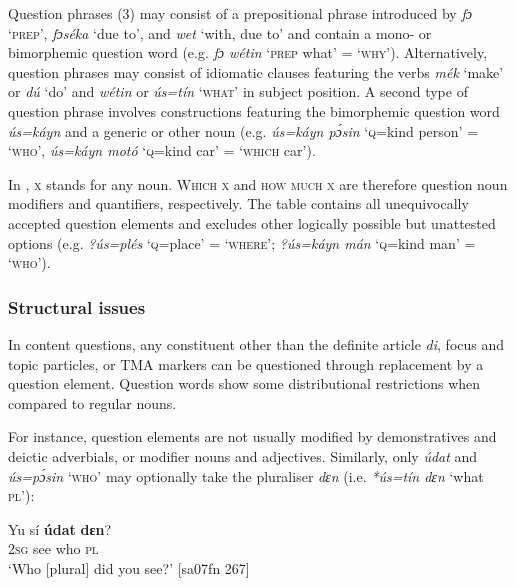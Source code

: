 Question phrases (3) may consist of a prepositional phrase introduced by \textit{fɔ} ‘\textsc{prep}’, \textit{fɔséka} ‘due to’, and \textit{wet} ‘with, due to’ and contain a mono- or bimorphemic question word (e.g. \textit{fɔ wétin} ‘\textsc{prep} what’ = ‘\textsc{why’}). Alternatively, question phrases may consist of idiomatic clauses featuring the verbs \textit{mék} ‘make’ or \textit{dú} ‘do’ and \textit{wétin} or \textit{ús=tín} ‘\textsc{what’} in subject position. A second type of question phrase involves constructions featuring the bimorphemic question word \textit{ús=káyn} and a generic or other noun (e.g. \textit{ús=káyn pɔ́sin} ‘\textsc{q}=kind person’ = ‘\textsc{who’}, \textit{ús=káyn motó} ‘\textsc{q}=kind car’ = ‘\textsc{which} car’). 


In , \textsc{x} stands for any noun. W\textsc{hich} \textsc{x} and \textsc{how} \textsc{much} \textsc{x} are therefore question noun modifiers and quantifiers, respectively. The table contains all unequivocally accepted question elements and excludes other logically possible but unattested options (e.g. \textit{?ús=plés} ‘\textsc{q}=place’ = ‘\textsc{where’}; \textit{?ús=káyn mán} ‘\textsc{q}=kind man’ = ‘\textsc{who’}).


\subsubsection{Structural issues}

In content questions, any constituent other than the definite article \textit{di}, focus and topic particles, or TMA markers can be questioned through replacement by a question element. Question words show some distributional restrictions when compared to regular nouns. 


For instance, question elements are not usually modified by demonstratives and deictic adverbials, or modifier nouns and adjectives. Similarly, only \textit{údat} and \textit{ús=pɔ́sin} ‘\textsc{who’} may optionally take the pluraliser \textit{dɛn} (i.e. \textit{*ús=tín dɛn} ‘what \textsc{pl}’): 



\ea%
    \label{ex:key:585}
    \gll Yu  sí  \textbf{údat}  \textbf{dɛn}?\\
\textsc{2sg}  see  who    \textsc{pl}\\

\glt ‘Who [plural] did you see?’ [sa07fn 267]
\z


